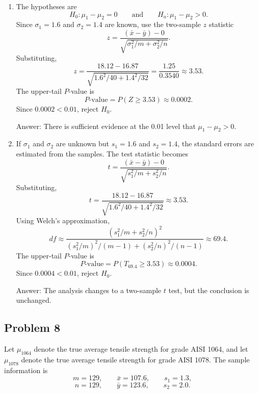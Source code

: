 \documentclass[11pt]{article}
\begin{document}
\begin{enumerate}
\item[(a)] The hypotheses are
\[
H_0:\mu_1-\mu_2=0
\qquad \text{and} \qquad
H_a:\mu_1-\mu_2>0.
\]
Since $\sigma_1=1.6$ and $\sigma_2=1.4$ are known, use the two-sample $z$ statistic
\[
z=\frac{(\bar{x}-\bar{y})-0}{\sqrt{\sigma_1^2/m+\sigma_2^2/n}}.
\]
Substituting,
\[
z=\frac{18.12-16.87}{\sqrt{1.6^2/40+1.4^2/32}}
=\frac{1.25}{0.3540}
\approx 3.53.
\]
The upper-tail $P$-value is
\[
P\text{-value}=P(Z\ge 3.53)\approx 0.0002.
\]
Since $0.0002<0.01$, reject $H_0$.

Answer: There is sufficient evidence at the 0.01 level that $\mu_1-\mu_2>0$.

\item[(d)] If $\sigma_1$ and $\sigma_2$ are unknown but $s_1=1.6$ and $s_2=1.4$, the standard errors are estimated from the samples. The test statistic becomes
\[
t=\frac{(\bar{x}-\bar{y})-0}{\sqrt{s_1^2/m+s_2^2/n}}.
\]
Substituting,
\[
t=\frac{18.12-16.87}{\sqrt{1.6^2/40+1.4^2/32}}
\approx 3.53.
\]
Using Welch's approximation,
\[
df\approx
\frac{(s_1^2/m+s_2^2/n)^2}{(s_1^2/m)^2/(m-1)+(s_2^2/n)^2/(n-1)}
\approx 69.4.
\]
The upper-tail $P$-value is
\[
P\text{-value}=P(T_{69.4}\ge 3.53)\approx 0.0004.
\]
Since $0.0004<0.01$, reject $H_0$.

Answer: The analysis changes to a two-sample $t$ test, but the conclusion is unchanged.
\end{enumerate}

\subsection*{Problem 8}

Let $\mu_{1064}$ denote the true average tensile strength for grade AISI 1064, and let $\mu_{1078}$ denote the true average tensile strength for grade AISI 1078. The sample information is
\[
m=129,
\qquad \bar{x}=107.6,
\qquad s_1=1.3,
\]
\[
n=129,
\qquad \bar{y}=123.6,
\qquad s_2=2.0.
\]
\end{document}
